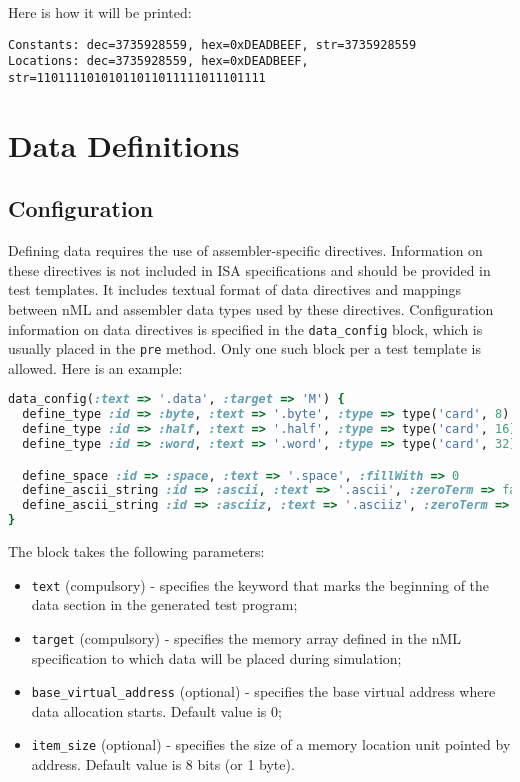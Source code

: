 \documentclass[oneside,final,12pt]{extreport}
\begin{document}
Here is how it will be printed:

\begin{lstlisting}
Constants: dec=3735928559, hex=0xDEADBEEF, str=3735928559
Locations: dec=3735928559, hex=0xDEADBEEF, str=11011110101011011011111011101111
\end{lstlisting}


\section{Data Definitions}

\subsection{Configuration}

Defining data requires the use of assembler-specific directives. Information on
these directives is not included in ISA specifications and should be provided in test
templates. It includes textual format of data directives and mappings between nML and
assembler data types used by these directives. Configuration information on data
directives is specified in the \texttt{data{\_}config} block, which is usually placed
in the \texttt{pre} method. Only one such block per a test template is allowed.
Here is an example:

\begin{lstlisting}[language=ruby]
data_config(:text => '.data', :target => 'M') {
  define_type :id => :byte, :text => '.byte', :type => type('card', 8)
  define_type :id => :half, :text => '.half', :type => type('card', 16)
  define_type :id => :word, :text => '.word', :type => type('card', 32)

  define_space :id => :space, :text => '.space', :fillWith => 0
  define_ascii_string :id => :ascii, :text => '.ascii', :zeroTerm => false
  define_ascii_string :id => :asciiz, :text => '.asciiz', :zeroTerm => true
}
\end{lstlisting}

The block takes the following parameters:

\begin{itemize}
  \item \texttt{text} (compulsory) - specifies the keyword that marks the beginning of
        the data section in the generated test program;

  \item \texttt{target} (compulsory) - specifies the memory array defined in the nML
        specification to which data will be placed during simulation;

  \item \texttt{base{\_}virtual{\_}address} (optional) - specifies the base virtual
        address where data allocation starts. Default value is 0;

  \item \texttt{item{\_}size} (optional) - specifies the size of a memory location unit
        pointed by address. Default value is 8 bits (or 1 byte).
\end{itemize}
\end{document}
